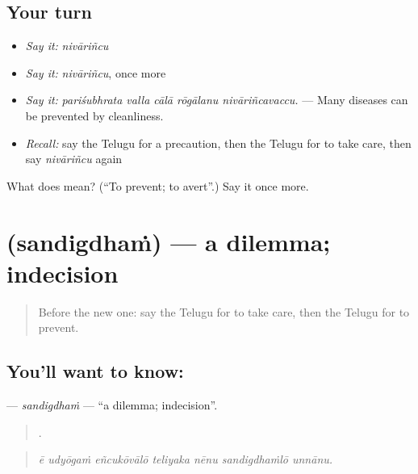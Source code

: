 \subsection*{Your turn}
\begin{itemize}
\raggedright
  \item \emph{Say it:} \emph{nivāriñcu}
  \item \emph{Say it:} \emph{nivāriñcu}, once more
  \item \emph{Say it:} \emph{pariśubhrata valla cālā rōgālanu nivāriñcavaccu.} — Many diseases can be prevented by cleanliness.
  \item \emph{Recall:} say the Telugu for a precaution, then the Telugu for to take care, then say \emph{nivāriñcu} again
\end{itemize}

\begin{tcolorbox}[breakable,colback=teal!4,colframe=teal!35!black,title={Before you move on}]
What does  mean? (\textquotedblleft{}To prevent; to avert\textquotedblright{}.) Say it once more.
\end{tcolorbox}
\section[\texorpdfstring{\te{సందిగ్ధం} (sandigdhaṁ)}{సందిగ్ధం (sandigdhaṁ)}]{ (sandigdhaṁ) — a dilemma; indecision}

\label{lesson:TE-C421-sandigdham}



\begin{quote}
Before the new one: say the Telugu for to take care, then the Telugu for to prevent.
\end{quote}

\subsection*{You'll want to know: }
\textbf{} — \emph{sandigdhaṁ} — \textquotedblleft{}a dilemma; indecision\textquotedblright{}.

\begin{quote}
      .
\end{quote}

\begin{quote}
\emph{ē udyōgaṁ eñcukōvālō teliyaka nēnu sandigdhaṁlō unnānu.}
\end{quote}

